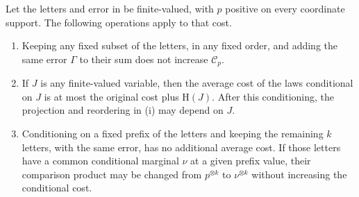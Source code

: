 \begin{lemma}
\label{entropy-foundations:cost-rules}
Let the letters and error in 
be finite-valued, with $p$ positive on every coordinate support.
The following operations apply to that cost.
\begin{enumerate}[label=\textup{(\roman*)},leftmargin=*]
\item Keeping any fixed subset of the letters, in any fixed order, and
adding the same error $\Gamma$ to their sum does not increase
$\mathcal C_p$.
\item If $J$ is any finite-valued variable, then the average cost of the
laws conditional on $J$ is at most the original cost plus $\mathrm H(J)$.
After this conditioning, the projection and reordering in
\textup{(i)} may depend on $J$.
\item Conditioning on a fixed prefix of the letters and keeping the
remaining $k$ letters, with the same error, has no additional average cost.
If those letters have a common conditional marginal $\nu$ at a given prefix
value, their comparison product may be changed from $p^{\otimes k}$ to
$\nu^{\otimes k}$ without increasing the conditional cost.
\end{enumerate}
\end{lemma}

